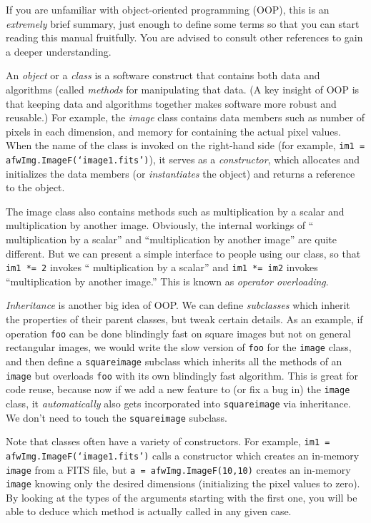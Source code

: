 

If you are unfamiliar with object-oriented programming (OOP), this is an
{\it extremely} brief summary, just enough to define some terms so
that you can start reading this manual fruitfully.  You are advised to
consult other references to gain a deeper understanding.

An {\it object} or a {\it class} is a software construct that contains
both data and algorithms (called {\it methods} for manipulating that
data.  (A key insight of OOP is that keeping data and algorithms
together makes software more robust and reusable.)  For example, the
{\it image} class contains data members such as number of pixels in
each dimension, and memory for containing the actual pixel values.
When the name of the class is invoked on the right-hand side (for
example, \texttt{im1 = afwImg.ImageF(`image1.fits')}), it serves as a
{\it constructor}, which allocates and initializes the data members
(or {\it instantiates} the object) and returns a reference to the
object.

The image class also contains methods such as multiplication by a
scalar and multiplication by another image. Obviously, the internal
workings of `` multiplication by a scalar'' and ``multiplication by
another image'' are quite different.  But we can present a simple
interface to people using our class, so that \texttt{im1 *= 2} invokes
`` multiplication by a scalar'' and \texttt{im1 *= im2} invokes
``multiplication by another image.''  This is known as {\it operator
  overloading}.

{\it Inheritance} is another big idea of OOP.  We can define {\it
  subclasses} which inherit the properties of their parent classes,
but tweak certain details.  As an example, if operation \texttt{foo}
can be done blindingly fast on square images but not on general
rectangular images, we would write the slow version of \texttt{foo}
for the \texttt{image} class, and then define a \texttt{squareimage}
subclass which inherits all the methods of an \texttt{image} but
overloads \texttt{foo} with its own blindingly fast algorithm.  This
is great for code reuse, because now if we add a new feature to (or
fix a bug in) the \texttt{image} class, it {\it automatically} also
gets incorporated into \texttt{squareimage} via inheritance.  We don't
need to touch the \texttt{squareimage} subclass.

Note that classes often have a variety of constructors.  For example,
\texttt{im1 = afwImg.ImageF(`image1.fits')} calls a constructor which
creates an in-memory \texttt{image} from a FITS file, but \texttt{a =
  afwImg.ImageF(10,10)} creates an in-memory \texttt{image} knowing
only the desired dimensions (initializing the pixel values to zero).
By looking at the types of the arguments starting with the first one,
you will be able to deduce which method is actually called in any
given case.

